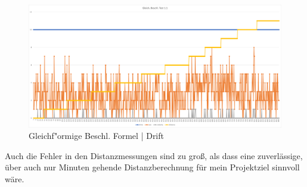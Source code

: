     \begin{figure} [h]
        \centering
        \includegraphics[width = 15cm]{Bilder/_constDistance001}
        \caption{Gleichf"ormige Beschl. Formel | Drift}
        \end{figure}
    
Auch die Fehler in den Distanzmessungen sind zu groß, als dass 
eine zuverlässige, über auch nur Minuten gehende Distanzberechnung für mein Projektziel sinnvoll wäre.